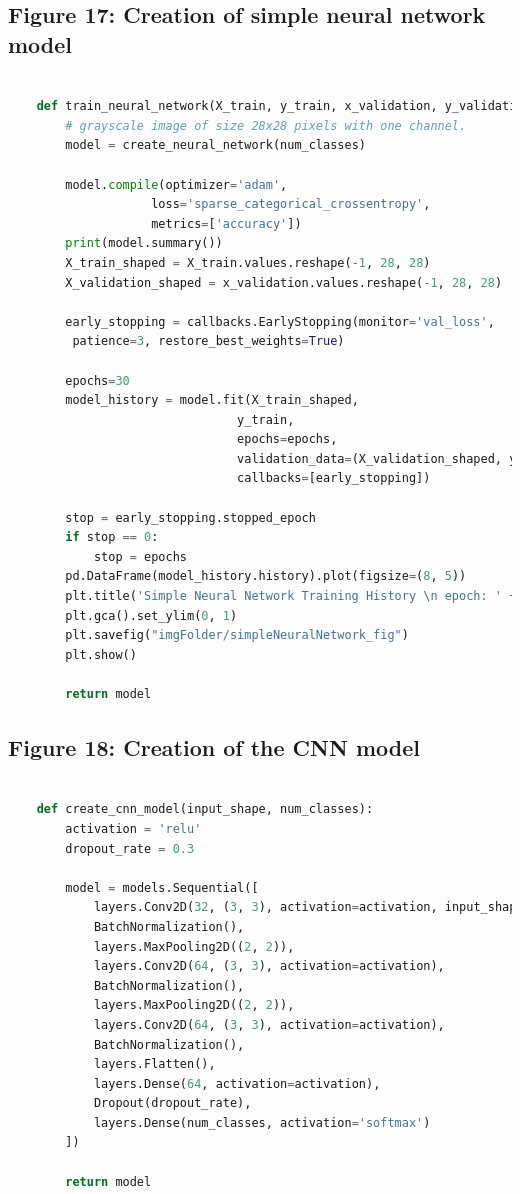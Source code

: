 \documentclass{article}
\begin{document}
\subsection{Figure 17: Creation of simple neural network model}
\begin{lstlisting}[language=Python]
    
    def train_neural_network(X_train, y_train, x_validation, y_validation, num_classes):
        # grayscale image of size 28x28 pixels with one channel.
        model = create_neural_network(num_classes)  
        
        model.compile(optimizer='adam',
                    loss='sparse_categorical_crossentropy',
                    metrics=['accuracy'])
        print(model.summary())
        X_train_shaped = X_train.values.reshape(-1, 28, 28)
        X_validation_shaped = x_validation.values.reshape(-1, 28, 28)
        
        early_stopping = callbacks.EarlyStopping(monitor='val_loss',
         patience=3, restore_best_weights=True)
        
        epochs=30
        model_history = model.fit(X_train_shaped, 
                                y_train,
                                epochs=epochs,
                                validation_data=(X_validation_shaped, y_validation),
                                callbacks=[early_stopping])

        stop = early_stopping.stopped_epoch
        if stop == 0:
            stop = epochs
        pd.DataFrame(model_history.history).plot(figsize=(8, 5))
        plt.title('Simple Neural Network Training History \n epoch: ' + str(stop))
        plt.gca().set_ylim(0, 1)
        plt.savefig("imgFolder/simpleNeuralNetwork_fig")
        plt.show()

        return model
\end{lstlisting}

\subsection{Figure 18: Creation of the CNN model}
\begin{lstlisting}[language=Python]
    
    def create_cnn_model(input_shape, num_classes):
        activation = 'relu'
        dropout_rate = 0.3

        model = models.Sequential([
            layers.Conv2D(32, (3, 3), activation=activation, input_shape=input_shape),  # 32 filters of size 3x3
            BatchNormalization(),
            layers.MaxPooling2D((2, 2)),
            layers.Conv2D(64, (3, 3), activation=activation),
            BatchNormalization(),
            layers.MaxPooling2D((2, 2)),
            layers.Conv2D(64, (3, 3), activation=activation),
            BatchNormalization(),
            layers.Flatten(),
            layers.Dense(64, activation=activation),
            Dropout(dropout_rate),
            layers.Dense(num_classes, activation='softmax')
        ])

        return model
\end{lstlisting}
\end{document}
